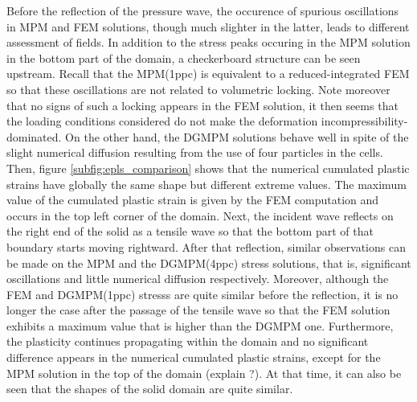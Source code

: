 Before the reflection of the pressure wave, the occurence of spurious oscillations in MPM and FEM solutions, though much slighter in the latter, leads to different assessment of fields.
In addition to the stress peaks occuring in the MPM solution in the bottom part of the domain, a checkerboard structure can be seen upstream.
Recall that the MPM(1ppc) is equivalent to a reduced-integrated FEM so that these oscillations are not related to volumetric locking.
Note moreover that no signs of such a locking appears in the FEM solution, it then seems that the loading conditions considered do not make the deformation incompressibility-dominated.
On the other hand, the DGMPM solutions behave well in spite of the slight numerical diffusion resulting from the use of four particles in the cells.
Then, figure \ref{subfig:epls_comparison} shows that the numerical cumulated plastic strains have globally the same shape but different extreme values.
The maximum value of the cumulated plastic strain is given by the FEM computation and occurs in the top left corner of the domain. 
% 
Next, the incident wave reflects on the right end of the solid as a tensile wave so that the bottom part of that boundary starts moving rightward.
After that reflection, similar observations can be made on the MPM and the DGMPM(4ppc) stress solutions, that is, significant oscillations and little numerical diffusion respectively.
Moreover, although the FEM and DGMPM(1ppc) stresss are quite similar before the reflection, it is no longer the case after the passage of the tensile wave so that the FEM solution exhibits a maximum value that is higher than the DGMPM one.
Furthermore, the plasticity continues propagating within the domain and no significant difference appears in the numerical cumulated plastic strains, except for the MPM solution in the top of the domain (explain ?).
At that time, it can also be seen that the shapes of the solid domain are quite similar.

